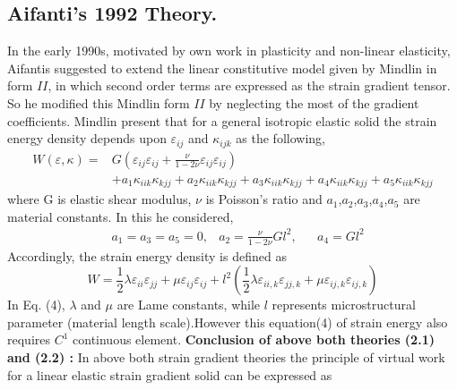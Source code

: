 \documentclass[12pt]{article}
\begin{document}
\subsection{Aifanti's 1992 Theory.} 
In the early 1990s, motivated by own work in plasticity and non-linear elasticity, Aifantis suggested to extend the linear constitutive model given by Mindlin in form $II$, in which second order terms are expressed as the strain gradient tensor. So he modified this Mindlin form $II$ by neglecting the most of the gradient coefficients. Mindlin present that for a general isotropic elastic solid the strain energy density depends upon
$\varepsilon_{ij}$ and $\kappa_{ijk}$ as the following,
\begin{equation}\label{two}
\begin{aligned}
W(\varepsilon,\kappa) = 
& G(\varepsilon_{ij}\varepsilon_{ij}+\frac{\nu}{1-2\nu}\varepsilon_{ij}\varepsilon_{ij}) \\
&    +a_1\kappa_{iik}\kappa_{kjj}+a_2\kappa_{iik}\kappa_{kjj}+a_3\kappa_{iik}\kappa_{kjj}+a_4\kappa_{iik}\kappa_{kjj}+a_5\kappa_{iik}\kappa_{kjj}
\end{aligned}
\end{equation}
where G is elastic shear modulus, $\nu$ is Poisson's ratio and $a_1$,$a_2$,$a_3$,$a_4$,$a_5$ are material constants.   
\newline
In this he considered,
\newline
\begin{equation}
\begin{aligned}
& a_1 = a_3 = a_5 = 0,   &   a_2 = \frac{\nu}{1-2\nu}Gl^2, &&  a_4 = Gl^2
\end{aligned}
\end{equation} 
Accordingly, the strain energy density is defined as
\begin{equation}
W = \frac{1}{2}\lambda\varepsilon_{ii}\varepsilon_{jj}+\mu\varepsilon_{ij}\varepsilon_{ij}+l^2(\frac{1}{2}\lambda\varepsilon_{ii,k}\varepsilon_{jj,k}+\mu\varepsilon_{ij,k}\varepsilon_{ij,k})
\end{equation}
In Eq. (4), $\lambda$ and $\mu$ are Lame constants, while $l$ represents microstructural parameter (material length scale).However this equation(4) of strain energy also requires 
$C^{1}$ continuous element.
\newline
\newline
\textbf{Conclusion of above both theories (2.1) and (2.2) : }
\newline
\newline
In above both strain gradient theories the principle of virtual work for a linear elastic strain gradient solid can be expressed as
\end{document}
